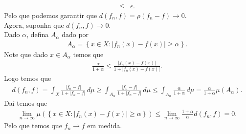 \begin{homeworkProblem}[7]
\begin{solution}
\begin{enumerate}[a)]
\begin{align*}
        \leq& \epsilon.
      \end{align*}
      Pelo que podemos garantir que $d(f_n,f)=\rho(f_n-f)\to 0$.\\
      Agora, suponha que $d(f_n,f)\to 0$.\\
      Dado $\alpha$, defina $A_{\alpha}$ dado por
      \begin{align*}
        A_{\alpha}=\left\{ x\in X:|f_n(x)-f(x)|\geq\alpha \right\}.
      \end{align*}
      Note que dado $x\in A_{\alpha}$ temos que
      \begin{align*}
        \frac{\alpha}{1+\alpha}\leq \frac{|f_n(x)-f(x)|}{1+|f_n(x)-f(x)|}.
      \end{align*}
      Logo temos que
      \begin{align*}
        d(f_n,f)=\int_{X}\frac{|f_n-f|}{1+|f_n-f|}\,d\mu\geq \int_{A_\alpha}\frac{|f_n-f|}{1+|f_n-f|}\,d\mu\leq \int_{A_\alpha}\frac{\alpha}{1+\alpha}\,d\mu=\frac{\alpha}{1+\alpha}\mu(A_\alpha).
      \end{align*}
      Daí temos que
      \begin{align*}
        \lim_{n \to \infty}\mu\left( \left\{ x\in X:|f_n(x)-f(x)|\geq\alpha \right\} \right)\leq \lim_{n \to \infty}\frac{1+\alpha}{\alpha}d(f_n,f)=0.
      \end{align*}
      Pelo que temos que $f_n\to f$ em medida. 
  \end{enumerate} 
  \end{solution}
\end{homeworkProblem}
